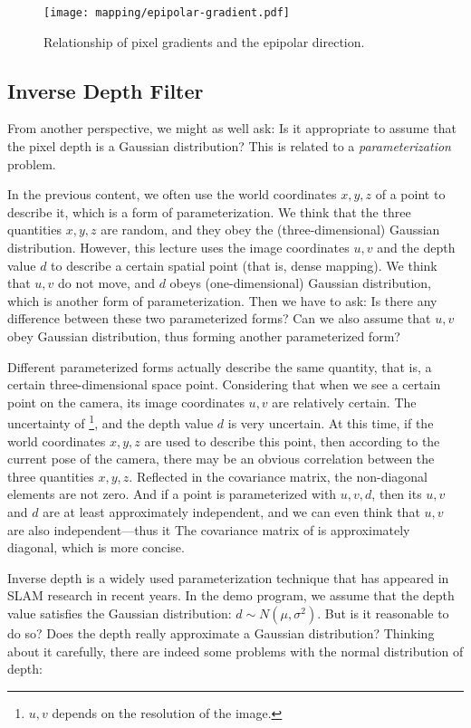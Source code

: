 \begin{figure}[!htp]
	\centering
	\texttt{[image: mapping/epipolar-gradient.pdf]}
	\caption{Relationship of pixel gradients and the epipolar direction.}
	\label{fig:epipolar-gradient}
\end{figure}

\subsection{Inverse Depth Filter}
From another perspective, we might as well ask: Is it appropriate to assume that the pixel depth is a Gaussian distribution? This is related to a \textit{parameterization} problem.

In the previous content, we often use the world coordinates $x, y, z$ of a point to describe it, which is a form of parameterization. We think that the three quantities $x, y, z$ are random, and they obey the (three-dimensional) Gaussian distribution. However, this lecture uses the image coordinates $u,v$ and the depth value $d$ to describe a certain spatial point (that is, dense mapping). We think that $u,v$ do not move, and $d$ obeys (one-dimensional) Gaussian distribution, which is another form of parameterization. Then we have to ask: Is there any difference between these two parameterized forms? Can we also assume that $u,v$ obey Gaussian distribution, thus forming another parameterized form?

Different parameterized forms actually describe the same quantity, that is, a certain three-dimensional space point. Considering that when we see a certain point on the camera, its image coordinates $u,v$ are relatively certain. The uncertainty of \footnote{$u,v$ depends on the resolution of the image. }, and the depth value $d$ is very uncertain. At this time, if the world coordinates $x,y,z$ are used to describe this point, then according to the current pose of the camera, there may be an obvious correlation between the three quantities $x,y,z$. Reflected in the covariance matrix, the non-diagonal elements are not zero. And if a point is parameterized with $u, v, d$, then its $u, v$ and $d$ are at least approximately independent, and we can even think that $u, v$ are also independent—thus it The covariance matrix of is approximately diagonal, which is more concise.

Inverse depth is a widely used parameterization technique {\cite{Montiel2006, Civera2008}} that has appeared in SLAM research in recent years. In the demo program, we assume that the depth value satisfies the Gaussian distribution: $d \sim N(\mu, \sigma^2)$. But is it reasonable to do so? Does the depth really approximate a Gaussian distribution? Thinking about it carefully, there are indeed some problems with the normal distribution of depth:


